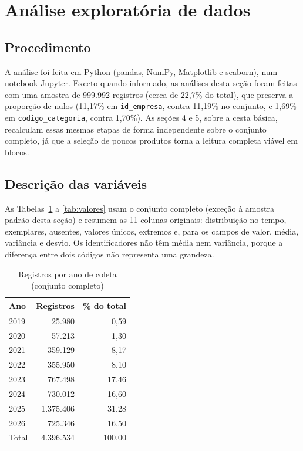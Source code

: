 \documentclass[11pt,a4paper]{article}
\newcommand{\col}[1]{\texttt{#1}}
\begin{document}
\section{Análise exploratória de dados}

\subsection{Procedimento}

A análise foi feita em Python (pandas, NumPy, Matplotlib e seaborn), num notebook Jupyter. Exceto quando informado, as análises desta seção foram feitas com uma amostra de 999.992 registros (cerca de 22,7\% do total), que preserva a proporção de nulos (11,17\% em \col{id\_empresa}, contra 11,19\% no conjunto, e 1,69\% em \col{codigo\_categoria}, contra 1,70\%). As seções 4 e 5, sobre a cesta básica, recalculam essas mesmas etapas de forma independente sobre o conjunto completo, já que a seleção de poucos produtos torna a leitura completa viável em blocos.

\subsection{Descrição das variáveis}

As Tabelas~\ref{tab:registros-ano} a \ref{tab:valores} usam o conjunto completo (exceção à amostra padrão desta seção) e resumem as 11 colunas originais: distribuição no tempo, exemplares, ausentes, valores únicos, extremos e, para os campos de valor, média, variância e desvio. Os identificadores não têm média nem variância, porque a diferença entre dois códigos não representa uma grandeza.

\begin{table}[H]
\caption{Registros por ano de coleta (conjunto completo)}
\label{tab:registros-ano}
\small
\centering
\begin{tabular}{@{}lrr@{}}
\toprule
\textbf{Ano} & \textbf{Registros} & \textbf{\% do total} \\
\midrule
2019 & 25.980 & 0,59 \\
2020 & 57.213 & 1,30 \\
2021 & 359.129 & 8,17 \\
2022 & 355.950 & 8,10 \\
2023 & 767.498 & 17,46 \\
2024 & 730.012 & 16,60 \\
2025 & 1.375.406 & 31,28 \\
2026 & 725.346 & 16,50 \\
\midrule
Total & 4.396.534 & 100,00 \\
\bottomrule
\end{tabular}
\end{table}
\end{document}
